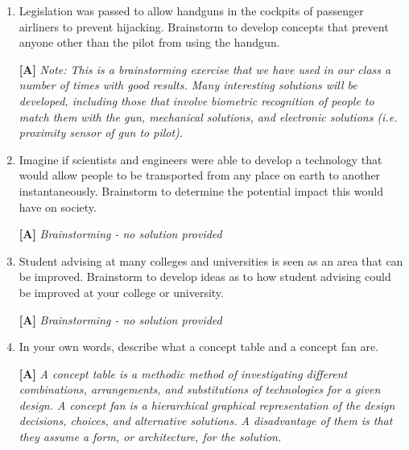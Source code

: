 \begin{enumerate}
\begin{itemize}
\end{itemize}

\item
  Legislation was passed to allow handguns in the cockpits of passenger
  airliners to prevent hijacking. Brainstorm to develop concepts that
  prevent anyone other than the pilot from using the handgun.

  \begin{onlysolution}
    \textbf{[A]}
    \itshape
    \emph{Note:} This is a brainstorming exercise that we have used in 
    our class a number of times with good results. Many interesting solutions 
    will be developed, including those that involve biometric recognition of 
    people to match them with the gun, mechanical solutions, and electronic 
    solutions (i.e. proximity sensor of gun to pilot).
  \end{onlysolution}

\item
  Imagine if scientists and engineers were able to develop a technology
  that would allow people to be transported from any place on earth to
  another instantaneously. Brainstorm to determine the potential impact
  this would have on society.

  \begin{onlysolution}
    \textbf{[A]}
    \itshape
    Brainstorming - no solution provided
  \end{onlysolution}

\item
  Student advising at many colleges and universities is seen as an area
  that can be im­proved. Brainstorm to develop ideas as to how student
  advising could be improved at your college or university.

  \begin{onlysolution}
    \textbf{[A]}
    \itshape
    Brainstorming - no solution provided
  \end{onlysolution}

\item
  In your own words, describe what a concept table and a concept fan
  are.

  \begin{onlysolution}
    \textbf{[A]}
    \itshape
    A concept table is a methodic method of investigating different 
    combinations, arrangements, and substitutions of technologies for a 
    given design. A concept fan is a hierarchical graphical representation 
    of the design decisions, choices, and alternative solutions. A 
    disadvantage of them is that they assume a form, or architecture, 
    for the solution.
  \end{onlysolution}


\end{enumerate}
